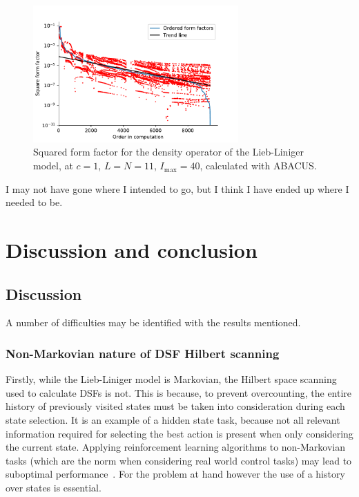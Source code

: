 \documentclass[11pt, a4paper]{report} %
\begin{document}
\begin{figure}[tb!]
  \centering
  \includegraphics[width=0.7\textwidth]{abacus_ff_sq.pdf}
  \caption{Squared form factor for the density operator of the Lieb-Liniger model, at \(c=1\), \(L=N=11\), \(I_{\max}=40\), calculated with ABACUS.}
  \label{fig:abacusformfactors}
\end{figure}







\begin{savequote}[50mm]
I may not have gone where I intended to go, but I think I have ended up where I needed to be.
\end{savequote}



\chapter{Discussion and conclusion}\label{chap:conclusion}


\section{Discussion}

A number of difficulties may be identified with the results mentioned.

\subsection{Non-Markovian nature of DSF Hilbert scanning}

Firstly, while the Lieb-Liniger model is Markovian, the Hilbert space scanning used to calculate DSFs is not.
This is because, to prevent overcounting, the entire history of previously visited states must be taken into consideration during each state selection.
It is an example of a hidden state task, because not all relevant information required for selecting the best action is present when only considering the current state.
Applying reinforcement learning algorithms to non-Markovian tasks (which are the norm when considering real world control tasks) may lead to suboptimal performance~\cite{whitehead95_reinf_learn_non_markov_decis_proces}.
For the problem at hand however the use of a history over states is essential.
\end{document}

